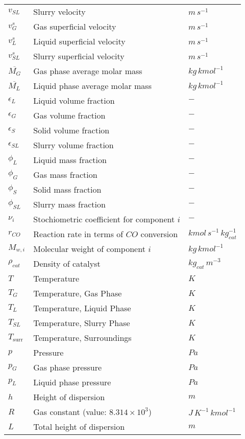 \documentclass{article}
\begin{document}
\begin{center}
\begin{longtable}{lll}
			$v_{SL}$ & Slurry velocity & $m\,s^{-1}$\\
			$v_G^s$ & Gas superficial velocity & $m\,s^{-1}$\\
			$v_L^s$ & Liquid superficial velocity & $m\,s^{-1}$\\
			$v_{SL}^s$ & Slurry superficial velocity & $m\,s^{-1}$\\
			$\overline{M_G}$ & Gas phase average molar mass & $kg\,kmol^{-1}$\\
			$\overline{M_L}$ & Liquid phase average molar mass & $kg\,kmol^{-1}$\\
			$\epsilon_L$ & Liquid volume fraction & $-$\\
			$\epsilon_G$ & Gas volume fraction & $-$\\
			$\epsilon_S$ & Solid volume fraction & $-$\\
			$\epsilon_{SL}$ & Slurry volume fraction & $-$\\
			$\phi_L$ & Liquid mass fraction & $-$\\
			$\phi_G$ & Gas mass fraction & $-$\\
			$\phi_S$ & Solid mass fraction & $-$\\
			$\phi_{SL}$ & Slurry mass fraction & $-$\\
			$\nu_i$ & Stochiometric coefficient for component $i$ & $-$ \\
			$r_{CO}$ & Reaction rate in terms of $CO$ conversion & $kmol\, s^{-1}\,kg_{cat}^{-1}$\\
			$M_{w,i}$ & Molecular weight of component $i$ & $kg\,kmol^{-1}$\\
			$\rho_{cat}$ & Density of catalyst & $kg_{cat}\,m^{-3}$\\ 
			$T$ & Temperature & $K$\\
			$T_G$ & Temperature, Gas Phase & $K$\\
			$T_L$ & Temperature, Liquid Phase & $K$\\
			$T_{SL}$ & Temperature, Slurry Phase & $K$\\
			$T_{\mathrm{surr}}$ & Temperature, Surroundings & $K$ \\
			$p$ & Pressure & $Pa$ \\
			$p_G$ & Gas phase pressure & $Pa$ \\
			$p_L$ & Liquid phase pressure & $Pa$ \\
			$h$ & Height of dispersion & $m$ \\ 
			$R$ & Gas constant (value: $8.314\times10^{3}$) & $J\,K^{-1}\,kmol^{-1}$\\
			$L$ & Total height of dispersion & $m$ \\

\end{longtable}
\end{center}
\end{document}
